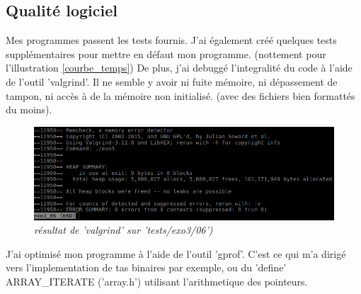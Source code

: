 \documentclass[10pt]{article}
\begin{document}
		\subsection{Qualité logiciel}
			Mes programmes passent les tests fournis. J'ai également créé quelques tests supplémentaires pour mettre en défaut mon programme.
			(nottement pour l'illustration \ref{courbe_temps})\newline
			De plus, j'ai debuggé l'integralité du code à l'aide de l'outil 'valgrind'.
			Il ne semble y avoir ni fuite mémoire, ni dépassement de tampon, ni accès à de la mémoire non initialisé.
			(avec des fichiers bien formattés du moins).
			\begin{figure}[H]
				\begin{center}
					\includegraphics[width=12cm,height=\textheight,keepaspectratio]{./images/valgrind.png}
				\end{center}
				\caption{\textit{résultat de 'valgrind' sur 'tests/exo3/06')}}
			\end{figure}
			J'ai optimisé mon programme à l'aide de l'outil 'gprof'. C'est ce qui m'a dirigé vers l'implementation de tas binaires par exemple,
			ou du 'define' ARRAY\_ITERATE ('array.h') utilisant l'arithmetique des pointeurs.

	\newpage
\end{document}
